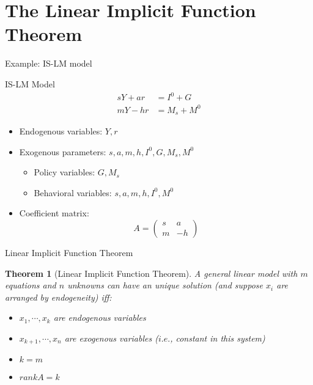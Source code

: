 \documentclass[final]{beamer}
\newtheorem{thm}{Theorem}
\begin{document}
\section{The Linear Implicit Function Theorem} %
\label{sec:the_linear_implicit_function_theorem}
\begin{frame}[t]{Example: IS-LM model}
	\begin{block}
		{IS-LM Model}
		\begin{align*}
			sY + ar &= I^0 + G \tag{IS}\\
			mY - hr &= M_s + M^0 \tag{LM} 
		\end{align*}
	\end{block}
	\begin{itemize}
		\item Endogenous variables: $Y,r$
		\item Exogenous parameters: $s,a,m,h,I^0,G,M_s,M^0$
		\begin{itemize}
			\item Policy variables: $G,M_s$
			\item Behavioral variables: $s,a,m,h,I^0,M^0$
		\end{itemize}
		\item Coefficient matrix:
		\[
			A=\begin{pmatrix}
				s&a\\m&-h
			\end{pmatrix}
		\]
	\end{itemize}
\end{frame}
\begin{frame}[t]{Linear Implicit Function Theorem}
	\begin{thm}
		[Linear Implicit Function Theorem]
		A general linear model with $m$ equations and $n$ unknowns can have an unique solution (and suppose $x_i$ are arranged by endogeneity) iff:
		\begin{itemize}
			\item $x_1,\cdots,x_k$ are endogenous variables
			\item $x_{k+1},\cdots, x_n$ are exogenous variables ($i.e.$, constant in this system)
			\item $k=m$
			\item $rank A = k$
		\end{itemize}
	\end{thm}
\end{frame}
\end{document}
